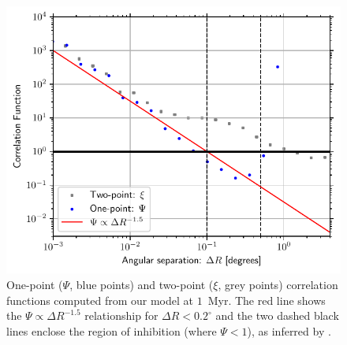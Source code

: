 \documentclass{aa}
\begin{document}
\begin{figure}
    \centering
    \includegraphics[width=\columnwidth]{Figures/correlation_functions.pdf}
    \caption{One-point ($\Psi$, blue points) and two-point ($\xi$, grey points) correlation functions computed from our model at $1$~Myr. The red line shows the $\Psi \propto \Delta R^{-1.5}$ relationship for $\Delta R < 0.2^\circ$ and the two dashed black lines enclose the region of inhibition (where $\Psi<1$), as inferred by \citet[][see their Figure 4]{Joncour17}. }
    \label{fig:corr_funcs}
\end{figure}
\end{document}
